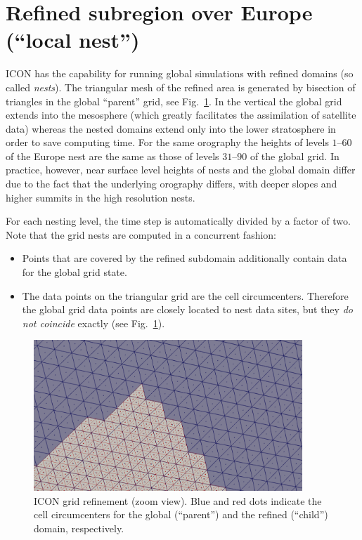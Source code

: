 \section{Refined subregion over Europe (``local nest'')}

ICON has the capability for running global simulations with refined
domains (so called \emph{nests}).
%
The triangular mesh of the refined area is generated by bisection of
triangles in the global ``parent'' grid, see
Fig.~\ref{fig:icon_grid_refinement_zoom_view}.
In the vertical the global grid extends into the mesosphere (which
greatly facilitates the assimilation of satellite data) whereas the
nested domains extend only into the lower stratosphere in order to
save computing time. For the same orography the heights of levels $1$--$60$ of
the Europe nest are the same as those of levels $31$--$90$ of the global grid. 
In practice, however, near surface level heights of nests and the global 
domain differ due to the fact that the underlying orography differs, 
with deeper slopes and higher summits in the high resolution nests.

For each nesting level, the time step is automatically divided by a
factor of two.
%
Note that the grid nests are computed in a concurrent fashion:  
\begin{itemize}
\item Points that are covered by the refined subdomain additionally
  contain data for the global grid state.
\item The data points on the triangular grid are the cell
  circumcenters. Therefore the global grid data points are closely
  located to nest data sites, but they \emph{do not coincide} exactly 
  (see Fig.~\ref{fig:icon_grid_refinement_zoom_view}).
\end{itemize}


\begin{figure}[hbt]
  \centering
  \includegraphics[width=0.90\textwidth]{pics/grid_refinement.png}
  \caption{ICON grid refinement (zoom view). Blue and red dots indicate the cell circumcenters for the global (``parent'') and the refined (``child'') domain, respectively.}
  \label{fig:icon_grid_refinement_zoom_view}
\end{figure}

